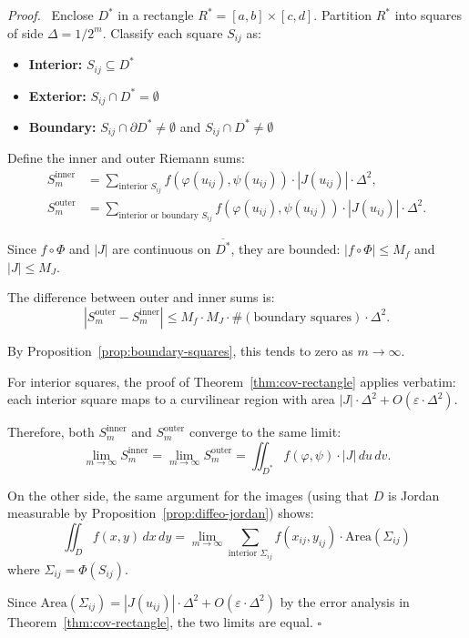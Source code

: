 \documentclass[11pt]{report}
\renewenvironment{proof}[1][Proof]{\par\noindent\textit{#1.}\ }{\hfill$\square$\par\medskip}
\begin{document}
\begin{proof}
Enclose $D^*$ in a rectangle $R^* = [a, b] \times [c, d]$. Partition $R^*$ into squares of side $\Delta = 1/2^m$. Classify each square $S_{ij}$ as:
\begin{itemize}
    \item \textbf{Interior:} $S_{ij} \subseteq D^*$
    \item \textbf{Exterior:} $S_{ij} \cap D^* = \emptyset$
    \item \textbf{Boundary:} $S_{ij} \cap \partial D^* \neq \emptyset$ and $S_{ij} \cap D^* \neq \emptyset$
\end{itemize}

Define the inner and outer Riemann sums:
\begin{align*}
S_m^{\text{inner}} &= \sum_{\text{interior } S_{ij}} f(\varphi(u_{ij}), \psi(u_{ij})) \cdot |J(u_{ij})| \cdot \Delta^2, \\
S_m^{\text{outer}} &= \sum_{\text{interior or boundary } S_{ij}} f(\varphi(u_{ij}), \psi(u_{ij})) \cdot |J(u_{ij})| \cdot \Delta^2.
\end{align*}

Since $f \circ \Phi$ and $|J|$ are continuous on $\overline{D^*}$, they are bounded: $|f \circ \Phi| \leq M_f$ and $|J| \leq M_J$.

The difference between outer and inner sums is:
\[
|S_m^{\text{outer}} - S_m^{\text{inner}}| \leq M_f \cdot M_J \cdot \#(\text{boundary squares}) \cdot \Delta^2.
\]

By Proposition~\ref{prop:boundary-squares}, this tends to zero as $m \to \infty$.

For interior squares, the proof of Theorem~\ref{thm:cov-rectangle} applies verbatim: each interior square maps to a curvilinear region with area $|J| \cdot \Delta^2 + O(\varepsilon \cdot \Delta^2)$.

Therefore, both $S_m^{\text{inner}}$ and $S_m^{\text{outer}}$ converge to the same limit:
\[
\lim_{m \to \infty} S_m^{\text{inner}} = \lim_{m \to \infty} S_m^{\text{outer}} = \iint_{D^*} f(\varphi, \psi) \cdot |J| \, du \, dv.
\]

On the other side, the same argument for the images (using that $D$ is Jordan measurable by Proposition~\ref{prop:diffeo-jordan}) shows:
\[
\iint_D f(x, y) \, dx \, dy = \lim_{m \to \infty} \sum_{\text{interior } \Sigma_{ij}} f(x_{ij}, y_{ij}) \cdot \text{Area}(\Sigma_{ij})
\]
where $\Sigma_{ij} = \Phi(S_{ij})$.

Since $\text{Area}(\Sigma_{ij}) = |J(u_{ij})| \cdot \Delta^2 + O(\varepsilon \cdot \Delta^2)$ by the error analysis in Theorem~\ref{thm:cov-rectangle}, the two limits are equal.
\end{proof}
\end{document}
